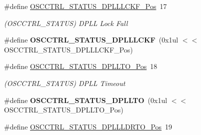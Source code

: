 \begin{DoxyCompactItemize}
\item 
\hypertarget{group___s_a_m_l21___o_s_c_c_t_r_l_ga368c1960d2b47358a6cf423ae08e9195}{}\#define \hyperlink{group___s_a_m_l21___o_s_c_c_t_r_l_ga368c1960d2b47358a6cf423ae08e9195}{O\+S\+C\+C\+T\+R\+L\+\_\+\+S\+T\+A\+T\+U\+S\+\_\+\+D\+P\+L\+L\+L\+C\+K\+F\+\_\+\+Pos}~17\label{group___s_a_m_l21___o_s_c_c_t_r_l_ga368c1960d2b47358a6cf423ae08e9195}

\begin{DoxyCompactList}\small\item\em (O\+S\+C\+C\+T\+R\+L\+\_\+\+S\+T\+A\+T\+U\+S) D\+P\+L\+L Lock Fall \end{DoxyCompactList}\item 
\hypertarget{group___s_a_m_l21___o_s_c_c_t_r_l_gaf29a2b0d08ce4a002d726cd3f682aa10}{}\#define {\bfseries O\+S\+C\+C\+T\+R\+L\+\_\+\+S\+T\+A\+T\+U\+S\+\_\+\+D\+P\+L\+L\+L\+C\+K\+F}~(0x1ul $<$$<$ O\+S\+C\+C\+T\+R\+L\+\_\+\+S\+T\+A\+T\+U\+S\+\_\+\+D\+P\+L\+L\+L\+C\+K\+F\+\_\+\+Pos)\label{group___s_a_m_l21___o_s_c_c_t_r_l_gaf29a2b0d08ce4a002d726cd3f682aa10}

\item 
\hypertarget{group___s_a_m_l21___o_s_c_c_t_r_l_ga59139901297b145a3d2f63858e516cbd}{}\#define \hyperlink{group___s_a_m_l21___o_s_c_c_t_r_l_ga59139901297b145a3d2f63858e516cbd}{O\+S\+C\+C\+T\+R\+L\+\_\+\+S\+T\+A\+T\+U\+S\+\_\+\+D\+P\+L\+L\+T\+O\+\_\+\+Pos}~18\label{group___s_a_m_l21___o_s_c_c_t_r_l_ga59139901297b145a3d2f63858e516cbd}

\begin{DoxyCompactList}\small\item\em (O\+S\+C\+C\+T\+R\+L\+\_\+\+S\+T\+A\+T\+U\+S) D\+P\+L\+L Timeout \end{DoxyCompactList}\item 
\hypertarget{group___s_a_m_l21___o_s_c_c_t_r_l_ga09131e8ecefc421218b9ad4df8e333d1}{}\#define {\bfseries O\+S\+C\+C\+T\+R\+L\+\_\+\+S\+T\+A\+T\+U\+S\+\_\+\+D\+P\+L\+L\+T\+O}~(0x1ul $<$$<$ O\+S\+C\+C\+T\+R\+L\+\_\+\+S\+T\+A\+T\+U\+S\+\_\+\+D\+P\+L\+L\+T\+O\+\_\+\+Pos)\label{group___s_a_m_l21___o_s_c_c_t_r_l_ga09131e8ecefc421218b9ad4df8e333d1}

\item 
\hypertarget{group___s_a_m_l21___o_s_c_c_t_r_l_gadc796b2e3efee5cc45c8f8ef1e55b101}{}\#define \hyperlink{group___s_a_m_l21___o_s_c_c_t_r_l_gadc796b2e3efee5cc45c8f8ef1e55b101}{O\+S\+C\+C\+T\+R\+L\+\_\+\+S\+T\+A\+T\+U\+S\+\_\+\+D\+P\+L\+L\+L\+D\+R\+T\+O\+\_\+\+Pos}~19\label{group___s_a_m_l21___o_s_c_c_t_r_l_gadc796b2e3efee5cc45c8f8ef1e55b101}


\end{DoxyCompactItemize}
